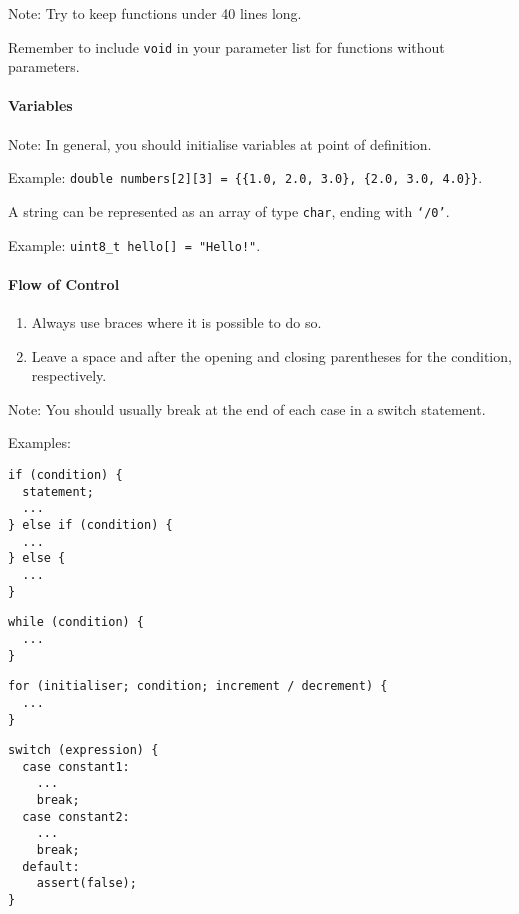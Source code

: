\documentclass[twocolumn,english]{article}
\begin{document}
Note: Try to keep functions under 40 lines long.

Remember to include \texttt{void} in your parameter list for functions
without parameters.

\paragraph{Variables}\label{variables}

Note: In general, you should initialise variables at point of
definition.

Example:
\texttt{double\ numbers{[}2{]}{[}3{]}\ =\ \{\{1.0,\ 2.0,\ 3.0\},\ \{2.0,\ 3.0,\ 4.0\}\}}.

A string can be represented as an array of type \texttt{char}, ending
with \texttt{`/0'}.

Example: \texttt{uint8\_t\ hello{[}{]}\ =\ "Hello!"}.

\paragraph{Flow of Control}\label{flow-of-control}

\begin{enumerate}
\def\labelenumi{\arabic{enumi}.}

\item
  Always use braces where it is possible to do so.
\item
  Leave a space and after the opening and closing parentheses for the
  condition, respectively.
\end{enumerate}

Note: You should usually break at the end of each case in a switch
statement.

Examples:

\begin{verbatim}
if (condition) {
  statement;
  ...
} else if (condition) {
  ...
} else {
  ...
}
\end{verbatim}

\begin{verbatim}
while (condition) {
  ...
}
\end{verbatim}

\begin{verbatim}
for (initialiser; condition; increment / decrement) {
  ...
}
\end{verbatim}

\begin{verbatim}
switch (expression) {
  case constant1:
    ...
    break;
  case constant2:
    ...
    break;
  default:
    assert(false);
}
\end{verbatim}
\end{document}
